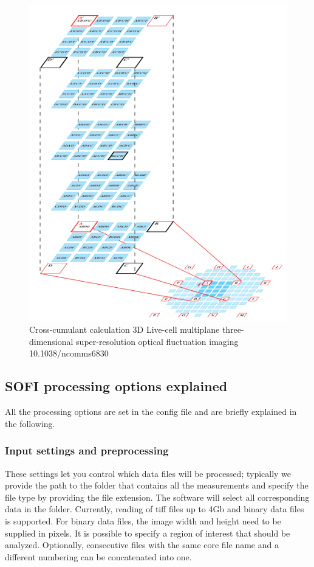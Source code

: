 \documentclass[final]{scrartcl}
\begin{document}
\begin{figure}[h]
  \includegraphics[width=0.5\linewidth]{4thOrderMultiplaneCumulant.png}
  \caption{Cross-cumulant calculation 3D Live-cell multiplane three-dimensional super-resolution optical fluctuation imaging 10.1038/ncomms6830}
  \label{fig:CCC}
\end{figure}

\subsection{SOFI processing options explained}

All the processing options are set in the config file and are briefly explained in the following.
\subsubsection*{Input settings and preprocessing}
These settings let you control which data files will be processed; typically we provide the path to the folder that contains all the measurements and specify the file type by providing the file extension. The software will select all corresponding data in the folder. Currently, reading of tiff files up to 4Gb and binary data files is supported. For binary data files, the image width and height need to be supplied in pixels. It is possible to specify a region of interest that should be analyzed. Optionally, consecutive files with the same core file name and a different numbering can be concatenated into one.
\end{document}
